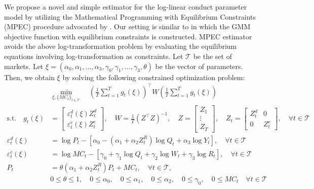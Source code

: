 \documentclass[11pt, a4paper]{article}
\begin{document}
We propose a novel and simple estimator for the log-linear conduct parameter model by utilizing the Mathematical Programming with Equilibrium Constraints (MPEC) procedure advocated by \cite{su2012constrained}. Our setting is similar to \cite{dube2012improving} in which the GMM objective function with equilibrium constraints is constructed. 
MPEC estimator avoids the above log-transformation problem by evaluating the equilibrium equations involving log-transformation as constraints.
Let $\mathcal{T}$ be the set of markets. Let $\xi = (\alpha_0,\alpha_1, \ldots, \alpha_3, \gamma_0,\gamma_1, \ldots, \gamma_3, \theta)$ be the vector of parameters. Then, we obtain $\xi$ by solving the following constrained optimization problem:
\begin{align}
    &\min_{\xi, \{MC_t\}_{t\in \mathcal{T}}}\quad \left(\frac{1}{T}\sum_{t=1}^{T}g_{t}(\xi)\right)^{\top} W\left(\frac{1}{T}\sum_{t=1}^{T}g_{t}(\xi)\right) \label{eq:objective_gmm}\\
    \text{s.t.}\quad g_{t}(\xi)&=\left[\begin{array}{l}
\varepsilon^{d}_{t}(\xi)Z_{t}^{d} \\
\varepsilon^{c}_{t}(\xi)Z_{t}^{c}
\end{array}\right], \quad W=\frac{1}{T}(Z^\top Z)^{-1}, \quad Z=\left[\begin{array}{c}
Z_{1} \\
\vdots \\
Z_{T}
\end{array}\right],\quad Z_{t}=\left[\begin{array}{ll}
Z_{t}^{d} & 0 \\
0 & Z_{t}^{c}
\end{array}\right],\quad  \forall t \in \mathcal{T}\nonumber\\
    \varepsilon^{d}_{t}(\xi)&=\log P_{t} -[\alpha_0 - (\alpha_1 + \alpha_2 Z^{R}_{t}) \log Q_t + \alpha_3 \log Y_t],\quad  \forall t \in \mathcal{T} \label{eq:demand_gmm}\\
    \varepsilon^{c}_{t} (\xi)&= \log MC_t -[\gamma_0 + \gamma_1 \log Q_t +  \gamma_2 \log W_{t} + \gamma_3 \log R_t],\quad  \forall t \in \mathcal{T}\label{eq:supply_gmm}\\
    P_t &= \theta (\alpha_1 + \alpha_2 Z^{R}_{t})P_t + MC_t,\quad  \forall t \in \mathcal{T},\label{eq:equilibrium_constraint}\\
    &0\le\theta \le 1,\quad  0 \le \alpha_0,\quad 0 \le \alpha_1, \quad 0 \le \alpha_2, \quad  0\le \gamma_0,\quad  0 \le MC_t  \quad  \forall t \in \mathcal{T}\label{eq:parameter_constraint}
\end{align}
\end{document}
